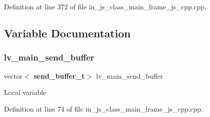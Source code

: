 Definition at line 372 of file in\+\_\+js\+\_\+class\+\_\+main\+\_\+frame\+\_\+js\+\_\+cpp.\+cpp.



\subsection{Variable Documentation}
\mbox{\label{group__main__frame_ga67b9772d1d4ab27f02761c51ff6bca8f}} 
\subsubsection{lv\_main\_send\_buffer}
{\footnotesize\ttfamily vector$<$\textbf{ send\+\_\+buffer\+\_\+t}$>$ lv\+\_\+main\+\_\+send\+\_\+buffer}

Local variable 

Definition at line 74 of file in\+\_\+js\+\_\+class\+\_\+main\+\_\+frame\+\_\+js\+\_\+cpp.\+cpp.

